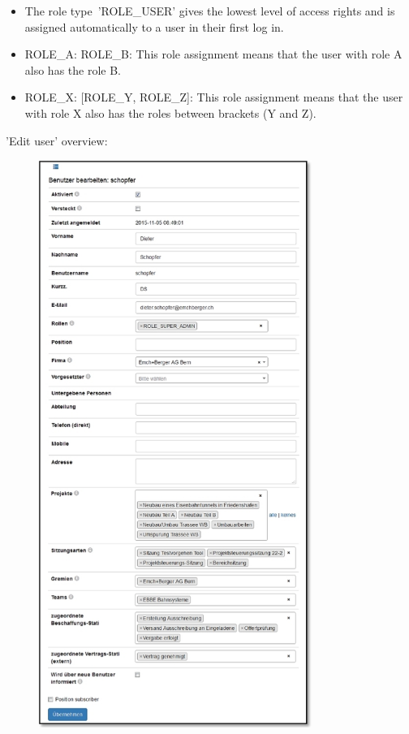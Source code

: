 \begin{itemize}
\item
The role type~'ROLE\_USER' gives the lowest level of access rights and is assigned automatically to a user in their first log in.
\item
ROLE\_A: ROLE\_B: This role assignment means that the user with role A also has the role B.
\item
ROLE\_X: [ROLE\_Y, ROLE\_Z]: This role assignment means that the user with role X also has the roles between brackets (Y and Z).
\end{itemize}

'Edit user' overview:

\vspace{\baselineskip}
\vspace{\baselineskip}

\begin{figure}
\vspace{-55pt}
\includegraphics[height=185mm]{../chapters/14_Benutzerverwaltung/pictures/14-1-1_BenutzerBearbeiten.jpg}
\end{figure}

